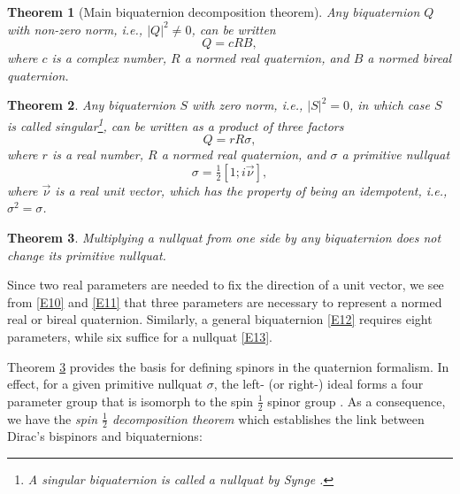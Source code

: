 \documentclass [12pt,a4paper      ]{article}
\newtheorem{theorem}{Theorem}
\begin{document}
%
\begin{theorem}[Main biquaternion decomposition theorem]
\label{theo:3}
%
     Any biquaternion $Q$ with non-zero norm, i.e., $|Q|^2 \neq 0$,
     can be written
%
     \begin{equation}\label{E12}
                          Q = c R B,                        %
     \end{equation}
%
     where $c$ is a complex number, $R$ a normed real quaternion, and  
     $B$ a normed bireal quaternion. 
%
\end{theorem}
%
%
\begin{theorem}
\label{theo:4}
%
     Any biquaternion $S$ with zero norm,  i.e.,  $|S|^2 = 0$, in
     which  case $S$ is called \emph{singular}\footnote{A singular biquaternion
     is  called a  \emph{nullquat} by Synge \cite{R8}.},  can  be 
     written as a product of three factors
%
     \begin{equation}\label{E13}
                 Q = r R \sigma,     %
     \end{equation}
%
     where $r$ is a real number, $R$ a normed real quaternion, and 
     $\sigma$ a primitive nullquat 
%
     \begin{equation}\label{E14}
               \sigma = \tfrac{1}{2} [ 1; i \vec{\nu}] ,      %
     \end{equation}
%
     where $\vec{\nu}$ is a real unit vector, which has the property of 
     being an \emph{idempotent}, i.e., $\sigma^2  = \sigma$.
%
\end{theorem}
%
%
\begin{theorem}
\label{theo:5}
%
     Multiplying a nullquat from one side by any biquaternion does 
     not change its primitive nullquat.
%
\end{theorem}
%


     Since two real parameters are needed to fix the direction of 
a  unit vector,  we see from \eqref{E10} and \eqref{E11} that three  parameters 
are  necessary  to represent a normed real or bireal  quaternion.  
Similarly, a general biquaternion \eqref{E12} requires eight parameters, 
while six suffice for a nullquat \eqref{E13}.

     Theorem \ref{theo:5} provides the basis for defining  spinors in the
quaternion formalism.   In effect,  for a given primitive nullquat 
$\sigma$, the left- (or right-) ideal forms a four parameter group that  is 
isomorph to the spin $\frac{1}{2}$ spinor group \cite{R9}.  As a consequence, 
we have the \emph{spin $\frac{1}{2}$ decomposition theorem} which establishes the link between Dirac's bispinors and biquaternions:
\end{document}
